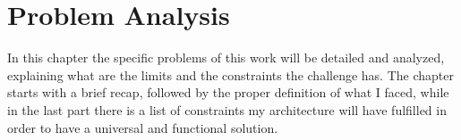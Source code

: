 %
%
\chapter{Problem Analysis}
%
\label{cap:probanalysis}
%
%

In this chapter the specific problems of this work will be detailed and analyzed, explaining what are the limits and the constraints the challenge has. The chapter starts with a brief recap, followed by the proper definition of what I faced, while in the last part there is a list of constraints my architecture will have fulfilled in order to have a universal and functional solution.
  

